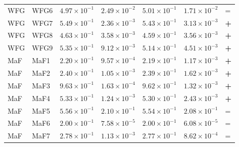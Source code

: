 \begin{table}[t]
\begin{tabular}{llrrrrl}
WFG & WFG6 & $4.97\!\times\!10^{-1}$ & $2.49\!\times\!10^{-2}$ & $5.01\!\times\!10^{-1}$ & $1.71\!\times\!10^{-2}$ & = \\
WFG & WFG7 & $5.49\!\times\!10^{-1}$ & $2.36\!\times\!10^{-3}$ & $5.43\!\times\!10^{-1}$ & $3.13\!\times\!10^{-3}$ & \textbf{+} \\
WFG & WFG8 & $4.63\!\times\!10^{-1}$ & $3.58\!\times\!10^{-3}$ & $4.59\!\times\!10^{-1}$ & $3.56\!\times\!10^{-3}$ & \textbf{+} \\
WFG & WFG9 & $5.35\!\times\!10^{-1}$ & $9.12\!\times\!10^{-3}$ & $5.14\!\times\!10^{-1}$ & $4.51\!\times\!10^{-3}$ & \textbf{+} \\
\addlinespace
MaF & MaF1 & $2.20\!\times\!10^{-1}$ & $9.57\!\times\!10^{-4}$ & $2.19\!\times\!10^{-1}$ & $1.17\!\times\!10^{-3}$ & \textbf{+} \\
MaF & MaF2 & $2.40\!\times\!10^{-1}$ & $1.05\!\times\!10^{-3}$ & $2.39\!\times\!10^{-1}$ & $1.62\!\times\!10^{-3}$ & \textbf{+} \\
MaF & MaF3 & $9.63\!\times\!10^{-1}$ & $1.63\!\times\!10^{-4}$ & $9.62\!\times\!10^{-1}$ & $1.32\!\times\!10^{-3}$ & \textbf{+} \\
MaF & MaF4 & $5.33\!\times\!10^{-1}$ & $1.24\!\times\!10^{-3}$ & $5.30\!\times\!10^{-1}$ & $2.43\!\times\!10^{-3}$ & \textbf{+} \\
MaF & MaF5 & $5.56\!\times\!10^{-1}$ & $2.10\!\times\!10^{-1}$ & $5.54\!\times\!10^{-1}$ & $2.08\!\times\!10^{-1}$ & = \\
MaF & MaF6 & $2.00\!\times\!10^{-1}$ & $7.58\!\times\!10^{-5}$ & $2.00\!\times\!10^{-1}$ & $6.08\!\times\!10^{-5}$ & = \\
MaF & MaF7 & $2.78\!\times\!10^{-1}$ & $1.13\!\times\!10^{-3}$ & $2.77\!\times\!10^{-1}$ & $8.62\!\times\!10^{-4}$ & = \\
\bottomrule
\end{tabular}
\end{table}
